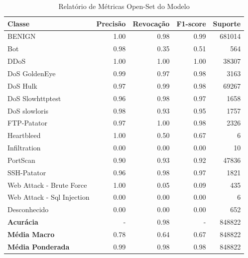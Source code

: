 \begin{table}[H]
    \centering
    \small
    \begin{tabular}{lrrrr}
        \hline
        Classe                     & Precisão & Revocação & F1-score & Suporte \\
        \hline
        BENIGN                     & 1.00     & 0.98      & 0.99     & 681014  \\
        Bot                        & 0.98     & 0.35      & 0.51     & 564     \\
        DDoS                       & 1.00     & 1.00      & 1.00     & 38307   \\
        DoS GoldenEye              & 0.99     & 0.97      & 0.98     & 3163    \\
        DoS Hulk                   & 0.97     & 0.99      & 0.98     & 69267   \\
        DoS Slowhttptest           & 0.96     & 0.98      & 0.97     & 1658    \\
        DoS slowloris              & 0.98     & 0.93      & 0.95     & 1757    \\
        FTP-Patator                & 0.97     & 1.00      & 0.98     & 2326    \\
        Heartbleed                 & 1.00     & 0.50      & 0.67     & 6       \\
        Infiltration               & 0.00     & 0.00      & 0.00     & 10      \\
        PortScan                   & 0.90     & 0.93      & 0.92     & 47836   \\
        SSH-Patator                & 0.96     & 0.98      & 0.97     & 1821    \\
        Web Attack - Brute Force   & 1.00     & 0.05      & 0.09     & 435     \\
        Web Attack - Sql Injection & 0.00     & 0.00      & 0.00     & 6       \\
        Desconhecido               & 0.00     & 0.00      & 0.00     & 652     \\
        \hline
        \textbf{Acurácia}          & -        & 0.98      & -        & 848822  \\
        \textbf{Média Macro}       & 0.78     & 0.64      & 0.67     & 848822  \\
        \textbf{Média Ponderada}   & 0.99     & 0.98      & 0.98     & 848822  \\
        \hline
    \end{tabular}
    \caption{Relatório de Métricas Open-Set do Modelo}
    \label{table:dnn_Sem_XSS_metricas}
\end{table}